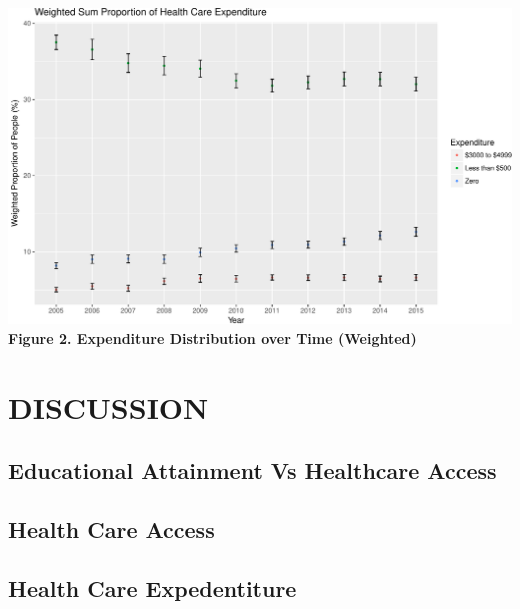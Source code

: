 \documentclass[10pt,]{article}
\makeatletter
\def\maxwidth{\ifdim\Gin@nat@width>\linewidth\linewidth
\else\Gin@nat@width\fi}
\let\Oldincludegraphics\includegraphics
\renewcommand{\includegraphics}[1]{\Oldincludegraphics[width=\maxwidth]{#1}}
\makeatother
\begin{document}
\smallskip

\includegraphics{paper_files/figure-latex/weightedexpendproportion-1.pdf}
\textbf{Figure 2. Expenditure Distribution over Time (Weighted)}

\smallskip

\section{DISCUSSION}\label{discussion}

\subsection{\texorpdfstring{\textbf{Educational Attainment Vs Healthcare
Access}}{Educational Attainment Vs Healthcare Access}}\label{educational-attainment-vs-healthcare-access-1}

\subsection{\texorpdfstring{\textbf{Health Care
Access}}{Health Care Access}}\label{health-care-access-1}

\subsection{\texorpdfstring{\textbf{Health Care
Expedentiture}}{Health Care Expedentiture}}\label{health-care-expedentiture-1}
\end{document}
